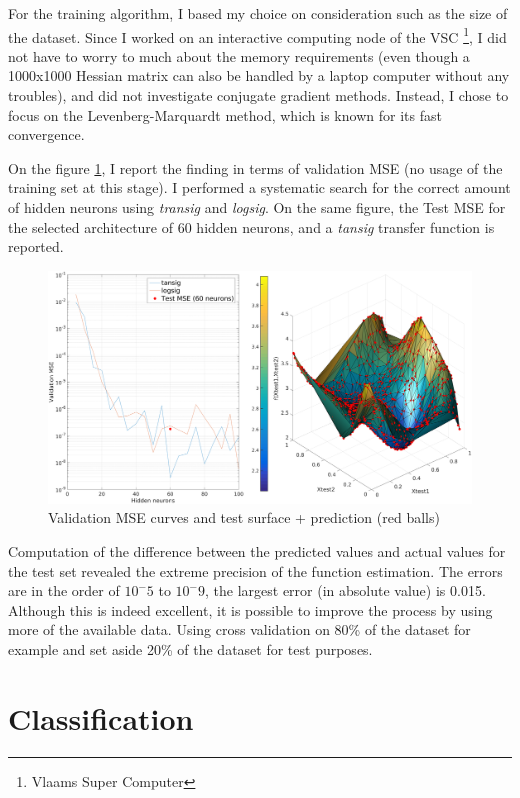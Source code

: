 \documentclass[11pt, a4paper]{article}
\begin{document}
For the training algorithm, I based my choice on consideration such as
the size of the dataset. Since I worked on an interactive computing
node of the VSC \footnote{Vlaams Super Computer}, I did not have to
worry to much about the memory requirements (even though a 1000x1000
Hessian matrix can also be handled by a laptop computer without any
troubles), and did not investigate conjugate gradient
methods. Instead, I chose to focus on the Levenberg-Marquardt method,
which is known for its fast convergence.

On the figure \ref{fig:test_mse_error}, I report the finding in terms
of validation MSE (no usage of the training set at this stage). I
performed a systematic search for the correct amount of hidden neurons
using \emph{transig} and \emph{logsig}. On the same figure, the Test
MSE for the selected architecture of 60 hidden neurons, and a
\emph{tansig} transfer function is reported.

\begin{figure}[H]
  \centering
  \includegraphics[scale=0.34]{regression_logtan_error.pdf}
  \caption{Validation MSE curves and test surface + prediction (red balls)}
  \label{fig:test_mse_error}
\end{figure}

Computation of the difference between the predicted values and actual
values for the test set revealed the extreme precision of the function
estimation. The errors are in the order of $10^-5$ to $10^-9$, the
largest error (in absolute value) is 0.015. Although this is indeed
excellent, it is possible to improve the process by using more of the
available data. Using cross validation on 80\% of the dataset for
example and set aside 20\% of the dataset for test purposes.

\section{Classification}


% 
\end{document}
